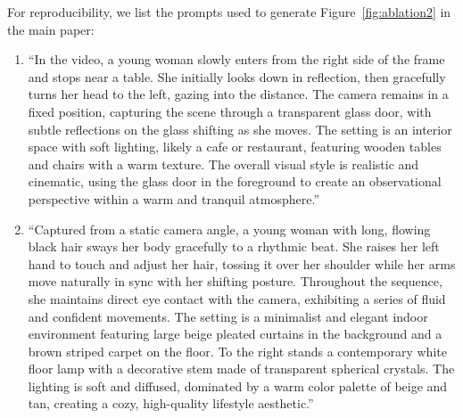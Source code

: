 \documentclass{llmxive}
\begin{document}
For reproducibility, we list the prompts used to generate Figure~\ref{fig:ablation2} in the main paper:
\begin{enumerate}
\item ``In the video, a young woman slowly enters from the right side of the frame and stops near a table. She initially looks down in reflection, then gracefully turns her head to the left, gazing into the distance. The camera remains in a fixed position, capturing the scene through a transparent glass door, with subtle reflections on the glass shifting as she moves. The setting is an interior space with soft lighting, likely a cafe or restaurant, featuring wooden tables and chairs with a warm texture. The overall visual style is realistic and cinematic, using the glass door in the foreground to create an observational perspective within a warm and tranquil atmosphere.''
% 
\item ``Captured from a static camera angle, a young woman with long, flowing black hair sways her body gracefully to a rhythmic beat. She raises her left hand to touch and adjust her hair, tossing it over her shoulder while her arms move naturally in sync with her shifting posture. Throughout the sequence, she maintains direct eye contact with the camera, exhibiting a series of fluid and confident movements. The setting is a minimalist and elegant indoor environment featuring large beige pleated curtains in the background and a brown striped carpet on the floor. To the right stands a contemporary white floor lamp with a decorative stem made of transparent spherical crystals. The lighting is soft and diffused, dominated by a warm color palette of beige and tan, creating a cozy, high-quality lifestyle aesthetic.''
\end{enumerate}
\end{document}
